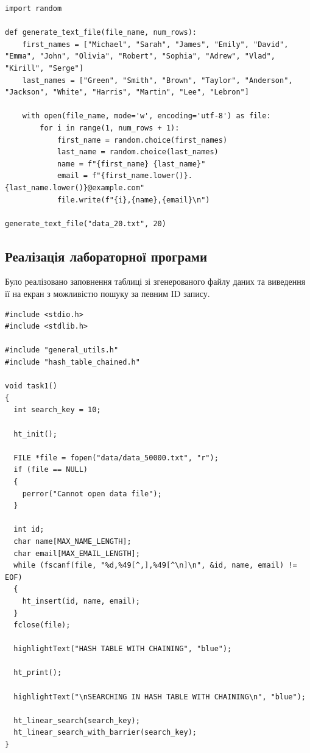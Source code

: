 \begin{lstlisting}[style=CStyle]
import random

def generate_text_file(file_name, num_rows):
    first_names = ["Michael", "Sarah", "James", "Emily", "David", "Emma", "John", "Olivia", "Robert", "Sophia", "Adrew", "Vlad", "Kirill", "Serge"]
    last_names = ["Green", "Smith", "Brown", "Taylor", "Anderson", "Jackson", "White", "Harris", "Martin", "Lee", "Lebron"]

    with open(file_name, mode='w', encoding='utf-8') as file:
        for i in range(1, num_rows + 1):
            first_name = random.choice(first_names)
            last_name = random.choice(last_names)
            name = f"{first_name} {last_name}"
            email = f"{first_name.lower()}.{last_name.lower()}@example.com"
            file.write(f"{i},{name},{email}\n")

generate_text_file("data_20.txt", 20)
\end{lstlisting}

\clearpage
\subsection{Реалізація лабораторної програми}
Було реалізовано заповнення таблиці зі згенерованого файлу даних та виведення її на екран з можливістю пошуку за певним ID запису.

\begin{lstlisting}[style=customc]
#include <stdio.h>
#include <stdlib.h>

#include "general_utils.h"
#include "hash_table_chained.h"

void task1()
{
  int search_key = 10;

  ht_init();

  FILE *file = fopen("data/data_50000.txt", "r");
  if (file == NULL)
  {
    perror("Cannot open data file");
  }

  int id;
  char name[MAX_NAME_LENGTH];
  char email[MAX_EMAIL_LENGTH];
  while (fscanf(file, "%d,%49[^,],%49[^\n]\n", &id, name, email) != EOF)
  {
    ht_insert(id, name, email);
  }
  fclose(file);

  highlightText("HASH TABLE WITH CHAINING", "blue");

  ht_print();

  highlightText("\nSEARCHING IN HASH TABLE WITH CHAINING\n", "blue");

  ht_linear_search(search_key);
  ht_linear_search_with_barrier(search_key);
}
\end{lstlisting}

